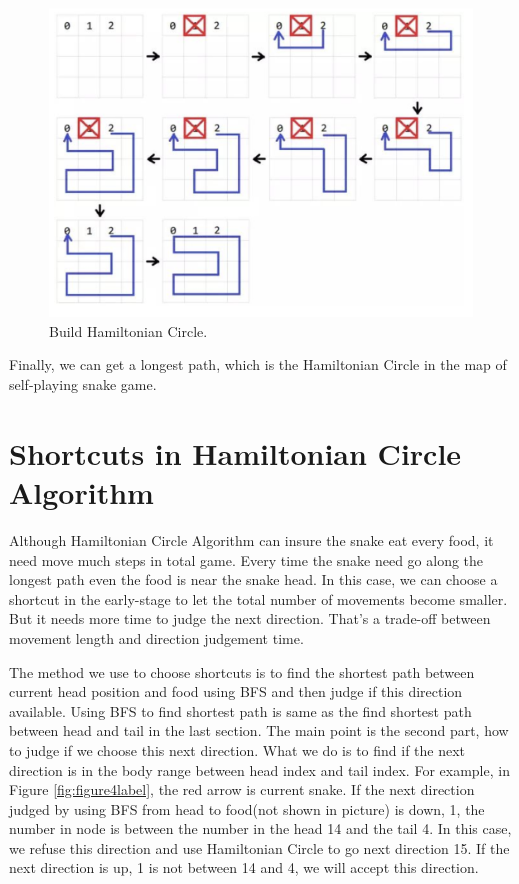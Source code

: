 \documentclass[12pt]{article}
\begin{document}
\begin{figure}[H]
\centering 
\includegraphics[scale = 0.4]{2.png}
\caption{Build Hamiltonian Circle.}
\label{fig:figure3label}
\end{figure}

Finally, we can get a longest path, which is the Hamiltonian Circle in the map of self-playing snake game.

\section{Shortcuts in Hamiltonian Circle Algorithm}

Although Hamiltonian Circle Algorithm can insure the snake eat every food, it need move much steps in total game. Every time the snake need go along the longest path even the food is near the snake head. In this case, we can choose a shortcut in the early-stage to let the total number of movements become smaller. But it needs more time to judge the next direction. That's a trade-off between movement length and direction judgement time. 

The method we use to choose shortcuts is to find the shortest path between current head position and food using BFS and then judge if this direction available. Using BFS to find shortest path is same as the find shortest path between head and tail in the last section. The main point is the second part, how to judge if we choose this next direction. What we do is to find if the next direction is in the body range between head index and tail index. For example, in Figure \ref{fig:figure4label}, the red arrow is current snake. If the next direction judged by using BFS from head to food(not shown in picture) is down, 1, the number in node is  between the number in the head 14 and the tail 4. In this case, we refuse this direction and use Hamiltonian Circle to go next direction 15. If the next direction is up, 1 is not between 14 and 4, we will accept this direction.  
\end{document}
